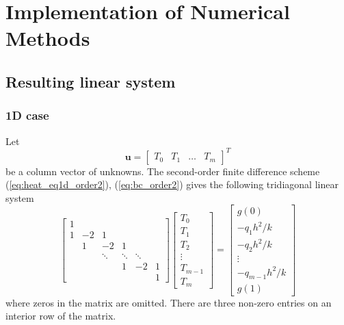 \documentclass{article}
\begin{document}
\section{Implementation of Numerical Methods}

\subsection{Resulting linear system} \label{subsection:linear_system}
\subsubsection{1D case}
Let $$\bm{u} = \begin{bmatrix} T_0 & T_1 & \dots & T_m \end{bmatrix}^T$$ be a column vector of unknowns.
The second-order finite difference scheme (\ref{eq:heat_eq1d_order2}), (\ref{eq:bc_order2}) gives the 
following tridiagonal linear system
\begin{equation*}
    \begin{bmatrix} 
    1 \\
    1 & -2 &  1 \\
      &  1 & -2     &  1   \\
      &    & \ddots & \ddots & \ddots \\
      &    &        & 1      & -2     &  1 \\
      &    &        &        &        &  1
    \end{bmatrix}
    \begin{bmatrix}
    T_0 \\ T_1 \\ T_2 \\ \vdots \\ T_{m-1} \\ T_m
    \end{bmatrix}
    =
    \begin{bmatrix}
    g(0) \\ -q_1 h^2/k \\ -q_2 h^2/k \\ \vdots \\ -q_{m-1} h^2/k \\ g(1)
    \end{bmatrix}
\end{equation*}
where zeros in the matrix are omitted. There are three non-zero entries on an interior row of the matrix.
\end{document}
